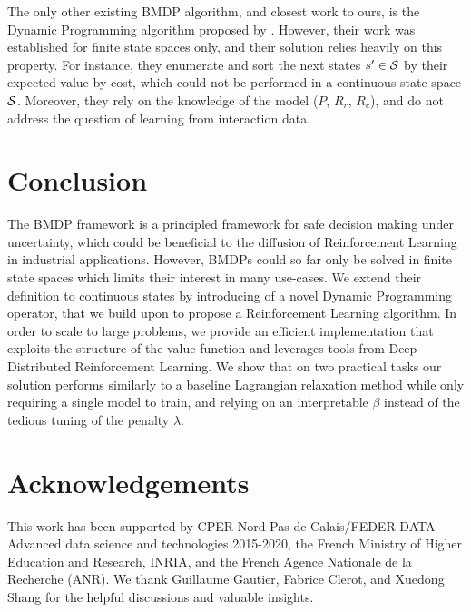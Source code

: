 \documentclass{article}
\begin{document}
The only other existing BMDP algorithm, and closest work to ours, is the Dynamic Programming algorithm proposed by \citet{Boutilier_Lu:uai16}. However, their work was established for finite state spaces only, and their solution relies heavily on this property. For instance, they enumerate and sort the next states $s'\in\mathcal{S}$ by their expected value-by-cost, which could not be performed in a continuous state space $\mathcal{S}$. Moreover, they rely on the knowledge of the model ($P$, $R_r$, $R_c$), and do not address the question of learning from interaction data.

\section{Conclusion}
\label{sec:conclusion}
The BMDP framework is a principled framework for safe decision making under uncertainty, which could be beneficial to the diffusion of Reinforcement Learning in industrial applications. However, BMDPs could so far only be solved in finite state spaces which limits their interest in many use-cases. We extend their definition to continuous states by introducing of a novel Dynamic Programming operator, that we build upon to propose a Reinforcement Learning algorithm. In order to scale to large problems, we provide an efficient implementation that exploits the structure of the value function and leverages tools from Deep Distributed Reinforcement Learning. We show that on two practical tasks our solution performs similarly to a baseline Lagrangian relaxation method while only requiring a single model to train, and relying on an interpretable $\beta$ instead of the tedious tuning of the penalty $\lambda$.

\section*{Acknowledgements}
    This work has been supported by CPER Nord-Pas de Calais/FEDER DATA Advanced data science and technologies 2015-2020, the French Ministry of Higher Education and Research, INRIA, and the French Agence Nationale de la Recherche (ANR). We thank Guillaume Gautier, Fabrice Clerot, and Xuedong Shang for the helpful discussions and valuable insights.
\clearpage



\clearpage

\end{document}
